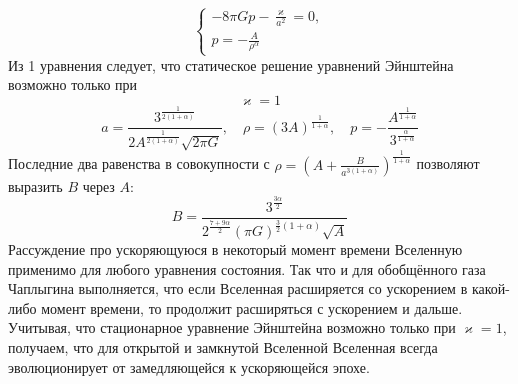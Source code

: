 \documentclass[12pt]{article}
\theoremstyle{definition}
\begin{document}
\begin{enumerate}
\begin{itemize}
\begin{equation}
\begin{cases}
            -8\pi Gp-\frac{\varkappa}{a^2}=0,\\
            p=-\frac{A}{\rho^\alpha}
        \end{cases}
        \end{equation}
        Из 1 уравнения следует, что статическое решение уравнений Эйнштейна возможно только при
        \begin{equation}
            \boxed{\varkappa=1}
        \end{equation}
        \begin{equation}
            \boxed{a=\frac{3^\frac{1}{2(1+\alpha)}}{2A^\frac{1}{2(1+\alpha)}\sqrt{2\pi G}},\quad\rho=(3A)^\frac{1}{1+\alpha},\quad p=-\frac{A^\frac{1}{1+\alpha}}{3^\frac{\alpha}{1+\alpha}}}
        \end{equation}
        Последние два равенства в совокупности с $\rho=\left(A+\frac{B}{a^{3(1+\alpha)}}\right)^{\frac{1}{1+\alpha}}$ позволяют выразить $B$ через $A$:
        \begin{equation}
            \boxed{B=\frac{3^\frac{3\alpha}{2}}{2^{\frac{7+9\alpha}{2}}(\pi G)^{\frac{3}{2}(1+\alpha)}\sqrt{A}}}
        \end{equation}
        Рассуждение про ускоряющуюся в некоторый момент времени Вселенную применимо для любого уравнения состояния. Так что и для обобщённого газа Чаплыгина выполняется, что если Вселенная расширяется со ускорением в какой-либо момент времени, то продолжит расширяться с ускорением и дальше. Учитывая, что стационарное уравнение Эйнштейна возможно только при $\varkappa=1$, получаем, что для открытой и замкнутой Вселенной Вселенная всегда эволюционирует от замедляющейся к ускоряющейся эпохе.\\

\end{itemize}
\end{enumerate}
\end{document}
